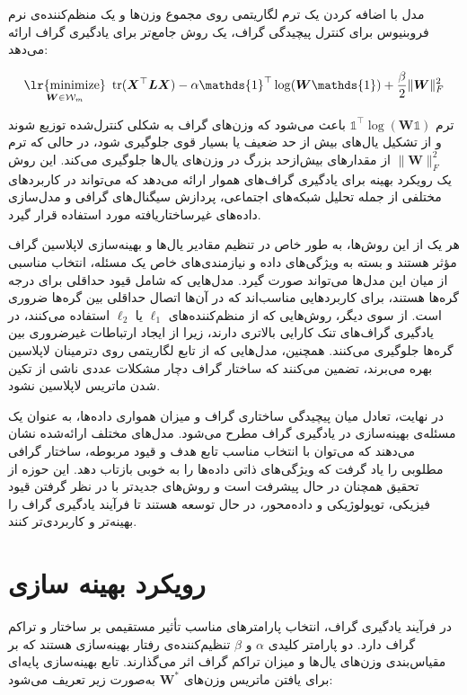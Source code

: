 \documentclass[10pt,twocolumn,a4paper]{article}
\newcommand\minimize[1]{\mathop{\text{\lr{minimize}}}\limits_{#1}\ }
\begin{document}
     مدل 
     \cite{Kalofolias2016}
     با اضافه کردن یک ترم لگاریتمی روی مجموع وزن‌ها و یک منظم‌کننده‌ی نرم فروبنیوس برای کنترل پیچیدگی گراف، یک روش جامع‌تر برای یادگیری گراف ارائه می‌دهد:
     
\begin{equation}
	    \minimize{\bm{W}\in\mathcal{W}_m} \text{tr} (\bm{X}^\top \bm{L} \bm{X}) - \alpha \mathds{1}^\top \log (\bm{W} \mathds{1}) + \frac{\beta}{2} \|\bm{W}\|_F^2
\end{equation}
     
     ترم \( \mathds{1}^\top \log (\bm{W} \mathds{1}) \) باعث می‌شود که وزن‌های گراف به شکلی کنترل‌شده توزیع شوند و از تشکیل یال‌های بیش از حد ضعیف یا بسیار قوی جلوگیری شود، در حالی که ترم \( \|\bm{W}\|_F^2 \) از مقدارهای بیش‌ازحد بزرگ در وزن‌های یال‌ها جلوگیری می‌کند. این روش یک رویکرد بهینه برای یادگیری گراف‌های هموار ارائه می‌دهد که می‌تواند در کاربردهای مختلفی از جمله تحلیل شبکه‌های اجتماعی، پردازش سیگنال‌های گرافی و مدل‌سازی داده‌های غیرساختاریافته مورد استفاده قرار گیرد.
     
     هر یک از این روش‌ها، به طور خاص در تنظیم مقادیر یال‌ها و بهینه‌سازی لاپلاسین گراف مؤثر هستند و بسته به ویژگی‌های داده و نیازمندی‌های خاص یک مسئله، انتخاب مناسبی از میان این مدل‌ها می‌تواند صورت گیرد. مدل‌هایی که شامل قیود حداقلی برای درجه گره‌ها هستند، برای کاربردهایی مناسب‌اند که در آن‌ها اتصال حداقلی بین گره‌ها ضروری است. از سوی دیگر، روش‌هایی که از منظم‌کننده‌های \(\ell_1\) یا \(\ell_2\) استفاده می‌کنند، در یادگیری گراف‌های تنک کارایی بالاتری دارند، زیرا از ایجاد ارتباطات غیرضروری بین گره‌ها جلوگیری می‌کنند. همچنین، مدل‌هایی که از تابع لگاریتمی روی دترمینان لاپلاسین بهره می‌برند، تضمین می‌کنند که ساختار گراف دچار مشکلات عددی ناشی از تکین شدن ماتریس لاپلاسین نشود.
     
     در نهایت، تعادل میان پیچیدگی ساختاری گراف و میزان همواری داده‌ها، به عنوان یک مسئله‌ی بهینه‌سازی در یادگیری گراف مطرح می‌شود. مدل‌های مختلف ارائه‌شده نشان می‌دهند که می‌توان با انتخاب مناسب تابع هدف و قیود مربوطه، ساختار گرافی مطلوبی را یاد گرفت که ویژگی‌های ذاتی داده‌ها را به خوبی بازتاب دهد. این حوزه از تحقیق همچنان در حال پیشرفت است و روش‌های جدیدتر با در نظر گرفتن قیود فیزیکی، توپولوژیکی و داده‌محور، در حال توسعه هستند تا فرآیند یادگیری گراف را بهینه‌تر و کاربردی‌تر کنند.
     
     
     
     
     
     

	\section{رویکرد بهینه سازی}     
      در فرآیند یادگیری گراف، انتخاب پارامترهای مناسب تأثیر مستقیمی بر ساختار و تراکم گراف دارد. دو پارامتر کلیدی \( \alpha \) و \( \beta \) تنظیم‌کننده‌ی رفتار بهینه‌سازی هستند که بر مقیاس‌بندی وزن‌های یال‌ها و میزان تراکم گراف اثر می‌گذارند. تابع بهینه‌سازی پایه‌ای برای یافتن ماتریس وزن‌های \( \bm{W}^* \) به‌صورت زیر تعریف می‌شود:
      
\end{document}
